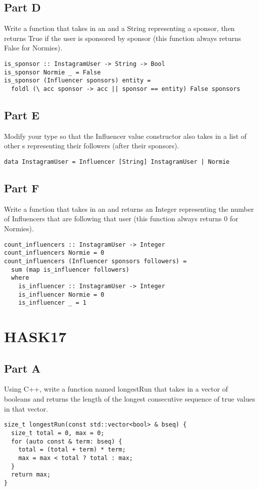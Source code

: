 \subsection*{Part D}
Write a function  that takes in an  and
a String representing a sponsor, then returns True if the user is
sponsored by sponsor (this function always returns False for Normies).
\begin{verbatim}
is_sponsor :: InstagramUser -> String -> Bool
is_sponsor Normie _ = False
is_sponsor (Influencer sponsors) entity =
  foldl (\ acc sponsor -> acc || sponsor == entity) False sponsors
\end{verbatim}

\subsection*{Part E}
Modify your  type so that the Influencer value
constructor also takes in a list of other s
representing their followers (after their sponsors).
\begin{verbatim}
data InstagramUser = Influencer [String] InstagramUser | Normie
\end{verbatim}

\subsection*{Part F}
Write a function  that takes in an
 and returns an Integer representing the number
of Influencers that are following that user (this function always
returns 0 for Normies).
\begin{verbatim}
count_influencers :: InstagramUser -> Integer
count_influencers Normie = 0
count_influencers (Influencer sponsors followers) =
  sum (map is_influencer followers)
  where
    is_influencer :: InstagramUser -> Integer
    is_influencer Normie = 0
    is_influencer _ = 1
\end{verbatim}

\section*{HASK17}
\subsection*{Part A}
Using C++, write a function named longestRun that takes in a vector of
booleans and returns the length of the longest consecutive sequence of
true values in that vector.
\begin{verbatim}
size_t longestRun(const std::vector<bool> & bseq) {
  size_t total = 0, max = 0;
  for (auto const & term: bseq) {
    total = (total + term) * term;
    max = max < total ? total : max;
  }
  return max;
}
\end{verbatim}


